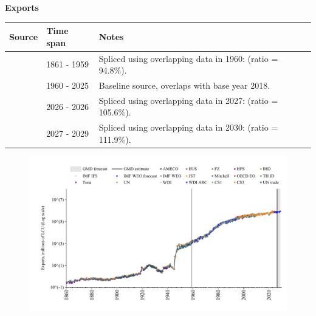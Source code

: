 \documentclass[12pt,a4paper,landscape]{article}
\begin{document}
\begin{adjustbox}{max totalsize={\paperwidth}{\paperheight},center}
\begin{minipage}[t][\textheight][t]{\textwidth}
\vspace*{0.5cm}
{}
\begin{center}
{\Large\bfseries Exports}
\end{center}
\vspace{0.5cm}
\begin{table}[H]
\centering
\small
\begin{tabular}{|l|l|l|}
\hline
\textbf{Source} & \textbf{Time span} & \textbf{Notes} \\
\hline
\rowcolor{white}\cite{CS1_ITA}& 1861 - 1959 &Spliced using overlapping data in 1960: (ratio = 94.8\%). \\
\rowcolor{lightgray}\cite{OECD_EO}& 1960 - 2025 &Baseline source, overlaps with base year 2018. \\
\rowcolor{white}\cite{AMECO}& 2026 - 2026 &Spliced using overlapping data in 2027: (ratio = 105.6\%). \\
\rowcolor{lightgray}\cite{IMF_WEO_forecast}& 2027 - 2029 &Spliced using overlapping data in 2030: (ratio = 111.9\%). \\
\hline
\end{tabular}
\end{table}
\begin{figure}[H]
\centering
\includegraphics[width=\textwidth,height=0.6\textheight,keepaspectratio]{graphs/ITA_exports.pdf}
\end{figure}
\end{minipage}
\end{adjustbox}
\end{document}
